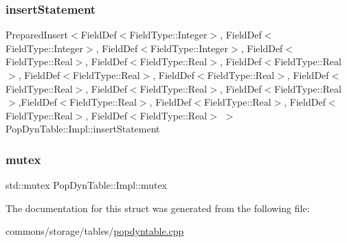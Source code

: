 \subsubsection{\texorpdfstring{insertStatement}{insertStatement}}
{\footnotesize\ttfamily Prepared\+Insert$<$Field\+Def$<$Field\+Type\+::\+Integer$>$, Field\+Def$<$Field\+Type\+::\+Integer$>$, Field\+Def$<$Field\+Type\+::\+Integer$>$, Field\+Def$<$Field\+Type\+::\+Real$>$, Field\+Def$<$Field\+Type\+::\+Real$>$, Field\+Def$<$Field\+Type\+::\+Real$>$, Field\+Def$<$Field\+Type\+::\+Real$>$, Field\+Def$<$Field\+Type\+::\+Real$>$, Field\+Def$<$Field\+Type\+::\+Real$>$, Field\+Def$<$Field\+Type\+::\+Real$>$, Field\+Def$<$Field\+Type\+::\+Real$>$,Field\+Def$<$Field\+Type\+::\+Real$>$, Field\+Def$<$Field\+Type\+::\+Real$>$, Field\+Def$<$Field\+Type\+::\+Real$>$, Field\+Def$<$Field\+Type\+::\+Real$>$ $>$ Pop\+Dyn\+Table\+::\+Impl\+::insert\+Statement}

\mbox{\label{struct_pop_dyn_table_1_1_impl_a3941fa343b3062e5a875edb5ad863954}} 
\subsubsection{\texorpdfstring{mutex}{mutex}}
{\footnotesize\ttfamily std\+::mutex Pop\+Dyn\+Table\+::\+Impl\+::mutex}



The documentation for this struct was generated from the following file\+:\begin{DoxyCompactItemize}
\item 
commons/storage/tables/\mbox{\hyperlink{popdyntable_8cpp}{popdyntable.\+cpp}}\end{DoxyCompactItemize}

